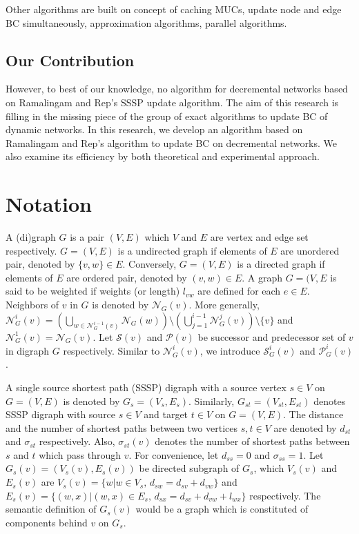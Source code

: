 \documentclass[twocolumn]{article}
\begin{document}
  Other algorithms are built on concept of caching MUCs\cite{Singh2015}, update node and edge BC simultaneously\cite{Kourtellis2015}, approximation algorithms\cite{Hayashi2015,Bergamini2015a,Bergamini2015b,Chernoskutov2015}, parallel algorithms\cite{Jamour2017}.

  \subsection*{Our Contribution}
  However, to best of our knowledge, no algorithm for decremental networks based on Ramalingam and Rep's SSSP update algorithm.
  The aim of this research is filling in the missing piece of the group of exact algorithms to update BC of dynamic networks.
  In this research, we develop an algorithm based on Ramalingam and Rep's algorithm to update BC on decremental networks.
  We also examine its efficiency by both theoretical and experimental approach.

  \section{Notation}
  A (di)graph $G$ is a pair $(V,E)$ which $V$ and $E$ are vertex and edge set respectively.
  $G=(V,E)$ is a undirected graph if elements of $E$ are unordered pair, denoted by $\{v,w\}\in E$.
  Conversely, $G=(V,E)$ is a directed graph if elements of $E$ are ordered pair, denoted by $(v,w)\in E$.
  A graph $G=(V,E$ is said to be weighted if weights (or length) $l_{vw}$ are defined for each $e\in E$.
  Neighbors of $v$ in $G$ is denoted by $\mathcal{N}_G(v)$. More generally, $\mathcal{N}_G^i(v)=\left(\bigcup_{w\in\mathcal{N}_G^{i-1}(v)}\mathcal{N}_G(w)\right)\setminus\left(\bigcup_{j=1}^{i-1}\mathcal{N}_G^j(v)\right)\setminus\{v\}$ and $\mathcal{N}_G^1(v)=\mathcal{N}_G(v)$.
  Let $\mathcal{S}(v)$ and $\mathcal{P}(v)$ be successor and predecessor set of $v$ in digraph $G$ respectively.
  Similar to $\mathcal{N}_G^i(v)$, we introduce $\mathcal{S}_G^i(v)$ and $\mathcal{P}_G^i(v)$.

  A single source shortest path (SSSP) digraph with a source vertex $s\in V$ on $G=(V,E)$ is denoted by $G_s=(V_s,E_s)$.
  Similarly, $G_{st}=(V_{st},E_{st})$ denotes SSSP digraph with source $s\in V$ and target $t\in V$ on $G=(V,E)$.
  The distance and the number of shortest paths between two vertices $s,t\in V$ are denoted by $d_{st}$ and $\sigma_{st}$ respectively.
  Also, $\sigma_{st}(v)$ denotes the number of shortest paths between $s$ and $t$ which pass through $v$.
  For convenience, let $d_{ss}=0$ and $\sigma_{ss}=1$.
  Let $G_{s}(v)=\left(V_s(v),E_s(v)\right)$ be directed subgraph of $G_s$, which  $V_s(v)$ and $E_s(v)$ are $V_s(v)=\{w|w\in V_s,\,d_{sw}=d_{sv}+d_{vw}\}$ and $E_s(v)=\{(w,x)|(w,x)\in E_s,\,d_{sx}=d_{sv}+d_{vw}+l_{wx}\}$ respectively.
  The semantic definition of $G_s(v)$ would be a graph which is constituted of components behind $v$ on $G_s$.
\end{document}
